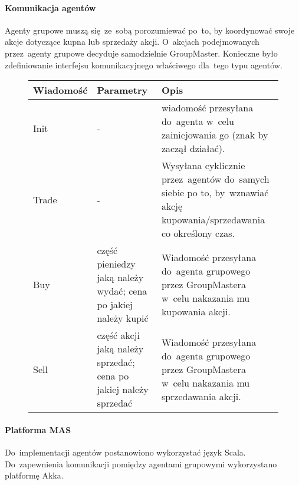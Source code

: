 \documentclass[11pt,a4paper]{article}
\begin{document}
\paragraph{Komunikacja agentów}
Agenty grupowe muszą się~ze~sobą porozumiewać po~to, by koordynować swoje akcje dotyczące kupna lub sprzedaży
akcji. O~akcjach podejmowanych przez~agenty grupowe decyduje samodzielnie GroupMaster.
Konieczne było zdefiniowanie interfejsu komunikacyjnego właściwego dla~tego typu agentów.

\begin{figure}[H]
  \begin{tabularx}{\textwidth}{ |p{4cm}|p{2.5cm}|X| }
    \hline
    \textbf{Wiadomość} & \textbf{Parametry} & \textbf{Opis} \\
    \hline
    Init & - & wiadomość przesyłana do~agenta w~celu zainicjowania go (znak by zaczął działać).\\
    \hline
    Trade & - & Wysyłana cyklicznie przez~agentów do~samych siebie po to, by~wznawiać akcję
    kupowania/sprzedawania co określony czas. \\
    \hline
    Buy & część pieniedzy jaką należy wydać; cena po jakiej należy kupić & Wiadomość przesyłana do~agenta
    grupowego przez GroupMastera w~celu nakazania mu kupowania akcji.\\
    \hline
    Sell & część akcji jaką należy sprzedać; cena po jakiej należy sprzedać & Wiadomość przesyłana
    do~agenta grupowego przez GroupMastera w~celu nakazania mu sprzedawania akcji.\\
    \hline
  \end{tabularx}
\end{figure}

\paragraph{Platforma MAS}
Do~implementacji agentów postanowiono wykorzystać język Scala. Do~zapewnienia komunikacji pomiędzy agentami grupowymi wykorzystano platformę Akka.
\end{document}
